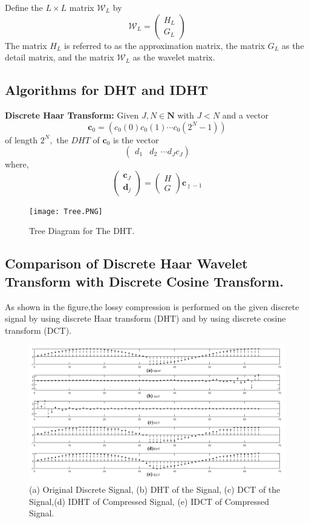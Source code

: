 Define the $L \times L$ matrix $\mathcal{W}_{L}$ by
$$
\mathcal{W}_{L}=\left(\begin{array}{c}{H_{L}} \\ {G_{L}}\end{array}\right)
$$
The matrix $H_{L}$ is referred to as the approximation matrix, the matrix $G_{L}$ as the detail matrix, and the matrix $\mathcal{W}_{L}$ as the wavelet matrix.

\subsection*{Algorithms for DHT and IDHT}

\textbf{Discrete Haar Transform:} Given $J, N \in \mathbf{N}$ with $J<N$ and a vector
$$
\mathbf{c}_{0}=\left(c_{0}(0) c_{0}(1) \cdots c_{0}\left(2^{N}-1\right)\right)
$$
of length $2^{N},$ the $D H T$ of $\mathbf{c}_{0}$ is the vector
$$
\left(\begin{array}{ll}{d_{1}} & {d_{2}}\end{array} \cdots d_{J} c_{J}\right)
$$
where,
$$
\left(\begin{array}{c}{\mathbf{c}_{J}} \\ {\mathbf{d}_{j}}\end{array}\right)=\left(\begin{array}{c}{H} \\ {G}\end{array}\right) \mathbf{c}_{\jmath-1}
$$

\begin{figure}[h]
    \centering
    \texttt{[image: Tree.PNG]}
    \caption{Tree Diagram for The DHT.}
    \label{fig:DHTS}
\end{figure}

\subsection{ Comparison of Discrete Haar Wavelet Transform with Discrete Cosine Transform.}
\par
As shown in the figure,the lossy compression is performed on the given discrete signal by using discrete Haar transform (DHT) and by using discrete cosine transform (DCT).   

\begin{figure}[h]
    \centering
    \includegraphics[width=\textwidth]{dht.png}
    \caption{(a) Original Discrete Signal, (b) DHT of the Signal, (c) DCT of the Signal,(d) IDHT of Compressed Signal, (e) IDCT of Compressed Signal.}
    \label{fig:dht_dct}
\end{figure}

